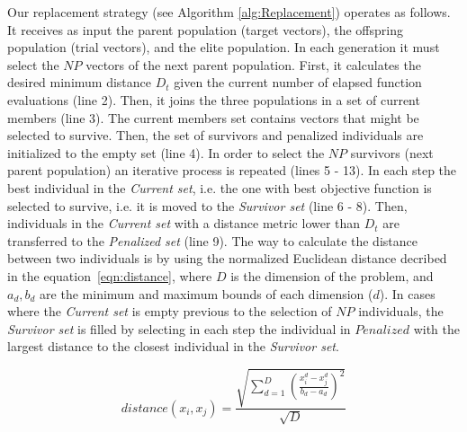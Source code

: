 Our replacement strategy (see Algorithm \ref{alg:Replacement}) operates as follows.
%
It receives as input the parent population (target vectors), the offspring population (trial vectors), and the elite population.
%
In each generation it must select the $NP$ vectors of the next parent population.
%
First, it calculates the desired minimum distance $D_t$ given the current number of elapsed function evaluations (line 2).
%
Then, it joins the three populations in a set of current members (line 3).
%
The current members set contains vectors that might be selected to survive.
%
Then, the set of survivors and penalized individuals are initialized to the empty set (line 4).
%
In order to select the $NP$ survivors (next parent population) an iterative process is repeated (lines 5 - 13).
%
In each step the best individual in the \textit{Current set}, i.e. the one with best objective function is selected
to survive, i.e. it is moved to the \textit{Survivor set} (line 6 - 8).
%
Then, individuals in the \textit{Current set} with a distance metric lower than $D_t$ are transferred to the \textit{Penalized set} (line 9).
%
The way to calculate the distance between two individuals is by using the normalized Euclidean distance decribed in the equation~\ref{eqn:distance}, where $D$ is the dimension of the problem, and $a_d, b_d$ are the minimum and maximum bounds of each dimension ($d$).
%
%
In cases where the \textit{Current set} is empty previous to the selection of $NP$ individuals, the \textit{Survivor set} is filled by selecting in each step 
the individual in $Penalized$ with the largest distance to the closest individual in the \textit{Survivor set}.

\begin{equation}\label{eqn:distance}
distance ( x_{i}, x_j ) = \frac{\sqrt{ \sum_{d=1}^D \left ( \frac{x_{i}^d - x_j^d}{b_d - a_d} \right )^2  }} {\sqrt{D}}
\end{equation}


